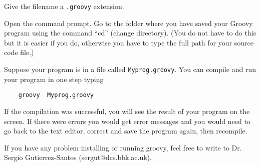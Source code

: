 Give the filename a \texttt{.groovy} extension.

Open the command prompt. 
Go to the folder where you have saved your Groovy
program using the command ``cd'' (change directory). (You do not have to
do this but it is easier if you do, otherwise you have to type the full
path for your source code file.)

Suppose your program is in a file called 
\texttt{Myprog.groovy}. You can compile and run your program in one step typing 

\begin{Verbatim}
    groovy  Myprog.groovy
\end{Verbatim}

If the compilation was successful, you will see the result of your
program on the screen.
%
If there were errors you would get error messages and you would need
to go back to the text editor, correct and save the program again,
then recompile.

If you have any problem installing or running groovy, feel free to
write to Dr. Sergio Gutierrez-Santos (sergut@dcs.bbk.ac.uk).



